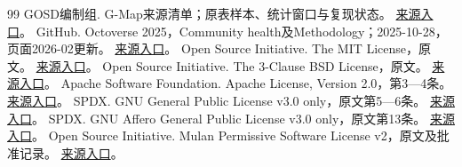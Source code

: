 \documentclass[UTF8,fontset=none,11pt,a4paper]{ctexart}
\begin{document}
\begin{thebibliography}{99}
 GOSD编制组. G-Map来源清单；原表样本、统计窗口与复现状态。 \href{https://github.com/X-lab2017/2026-Global-Open-Source-Development-Report/blob/c51e3441361407b68f10b339d97eff288319b503/preview/content/gmap/source-manifest.json}{来源入口}。
 GitHub. Octoverse 2025，Community health及Methodology；2025-10-28，页面2026-02更新。 \href{https://github.blog/news-insights/octoverse/octoverse-a-new-developer-joins-github-every-second-as-ai-leads-typescript-to-1/}{来源入口}。
 Open Source Initiative. The MIT License，原文。 \href{https://opensource.org/license/mit}{来源入口}。
 Open Source Initiative. The 3-Clause BSD License，原文。 \href{https://opensource.org/license/bsd-3-clause}{来源入口}。
 Apache Software Foundation. Apache License, Version 2.0，第3—4条。 \href{https://www.apache.org/licenses/LICENSE-2.0}{来源入口}。
 SPDX. GNU General Public License v3.0 only，原文第5—6条。 \href{https://spdx.org/licenses/GPL-3.0-only.html}{来源入口}。
 SPDX. GNU Affero General Public License v3.0 only，原文第13条。 \href{https://spdx.org/licenses/AGPL-3.0-only.html}{来源入口}。
 Open Source Initiative. Mulan Permissive Software License v2，原文及批准记录。 \href{https://opensource.org/license/MulanPSL-2.0}{来源入口}。
\end{thebibliography}\endgroup
\end{document}
